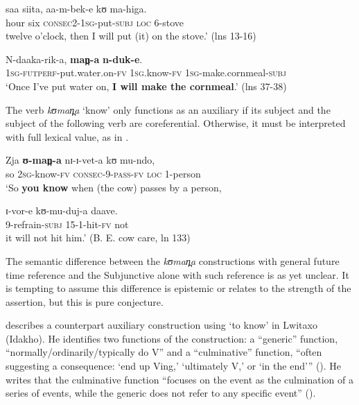 \documentclass[output=paper]{langsci/langscibook}
\begin{document}
\gll saa   siita,   aa-m-bek-e       kʊ   ma-higa. \\
hour  six  \textsc{consec2-1sg}{}-put-\textsc{subj}  \textsc{loc}  6-stove \\
\glt twelve o'clock, then I will put (it) on the stove.’ (lns 13-16)
\z 

\ea\label{ex:sarvasy:24}
\gll N-daaka-rik-a,         \textbf{man̪-a}     \textbf{n-duk-e}. \\
\textsc{1sg-futperf}{}-put.water.on-\textsc{fv}  1\textsc{sg.}know-\textsc{fv}    \textsc{1sg}-make.cornmeal-\textsc{subj} \\
\glt ‘Once I've put water on, \textbf{I will make the cornmeal}.’ (lns 37-38)
\z

The verb \textit{kʊman̪a }‘know’ only functions as an auxiliary if its subject and the subject of the following verb are coreferential. Otherwise, it must be interpreted with full lexical value, as in .

\ea\label{ex:sarvasy:25}
\gll Zja   \textbf{ʊ{}-man̪-a}     nɪ-ɪ{}-vet-a     kʊ     mu-ndo, \\
so  2\textsc{sg-}know\textsc{{}-fv}  \textsc{consec}{}-9-\textsc{pass}{}-\textsc{fv}   \textsc{loc}  1-person \\
\glt ‘So \textbf{you know} when (the cow) passes by a person,

\gll ɪ{}-vor-e     kʊ-mu-duj-a   daave. \\
9-refrain-\textsc{subj}  15-1-hit-\textsc{fv}  not \\
\glt it will not hit him.’ (B. E. cow care, ln 133)
\z

The semantic difference between the \textit{kʊman̪a }constructions with general future time reference and the Subjunctive alone with such reference is as yet unclear. It is tempting to assume this difference is epistemic or relates to the strength of the assertion, but this is pure conjecture.

\citet{Botne2009} describes a counterpart auxiliary construction using ‘to know’ in Lwitaxo (Idakho). He identifies two functions of the construction: a “generic” function, “normally/ordinarily/typically do V” and a “culminative” function, “often suggesting a consequence: ‘end up Ving,’ ‘ultimately V,’ or ‘in the end’” (\citeyear[93]{Botne2009}). He writes that the culminative function “focuses on the event as the culmination of a series of events, while the generic does not refer to any specific event” (\citeyear[95]{Botne2009}).
\end{document}
